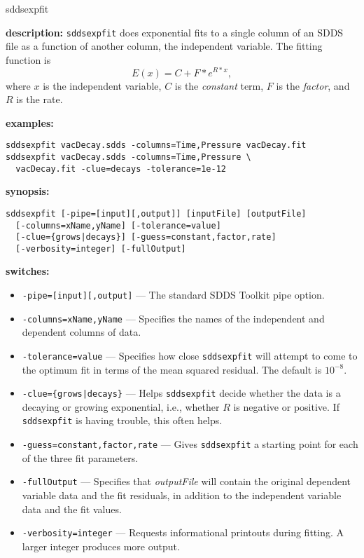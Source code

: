 \begin{sddsprog}{sddsexpfit}
  \item \textbf{description:}
    \verb|sddsexpfit| does exponential fits to a single column of an SDDS file as a function of another column, the independent variable. The fitting function is
    \[
      E(x) = C + F * e^{R*x},
    \]
    where $x$ is the independent variable, $C$ is the \emph{constant} term, $F$ is the \emph{factor}, and $R$ is the rate.
  \item \textbf{examples:}
  \begin{verbatim}
sddsexpfit vacDecay.sdds -columns=Time,Pressure vacDecay.fit
sddsexpfit vacDecay.sdds -columns=Time,Pressure \
  vacDecay.fit -clue=decays -tolerance=1e-12
  \end{verbatim}
  \item \textbf{synopsis:}
  \begin{verbatim}
sddsexpfit [-pipe=[input][,output]] [inputFile] [outputFile]
  [-columns=xName,yName] [-tolerance=value]
  [-clue={grows|decays}] [-guess=constant,factor,rate]
  [-verbosity=integer] [-fullOutput]
  \end{verbatim}
  \item \textbf{switches:}
    \begin{itemize}
      \item \verb|-pipe=[input][,output]| --- The standard SDDS Toolkit pipe option.
      \item \verb|-columns=xName,yName| --- Specifies the names of the independent and dependent columns of data.
      \item \verb|-tolerance=value| --- Specifies how close \verb|sddsexpfit| will attempt to come to the optimum fit in terms of the mean squared residual. The default is $10^{-8}$.
      \item \verb!-clue={grows|decays}! --- Helps \verb|sddsexpfit| decide whether the data is a decaying or growing exponential, i.e., whether $R$ is negative or positive. If \verb|sddsexpfit| is having trouble, this often helps.
      \item \verb|-guess=constant,factor,rate| --- Gives \verb|sddsexpfit| a starting point for each of the three fit parameters.
      \item \verb|-fullOutput| --- Specifies that \emph{outputFile} will contain the original dependent variable data and the fit residuals, in addition to the independent variable data and the fit values.
      \item \verb|-verbosity=integer| --- Requests informational printouts during fitting. A larger integer produces more output.

\end{itemize}
\end{sddsprog}

